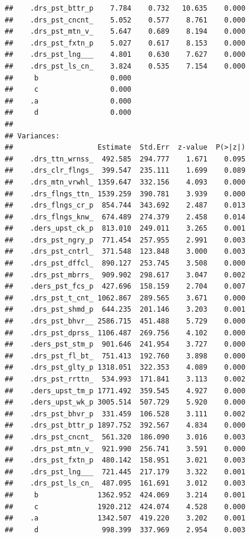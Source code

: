 \documentclass[
]{book}
\begin{document}
\begin{verbatim}
##    .drs_pst_bttr_p    7.784    0.732   10.635    0.000
##    .drs_pst_cncnt_    5.052    0.577    8.761    0.000
##    .drs_pst_mtn_v_    5.647    0.689    8.194    0.000
##    .drs_pst_fxtn_p    5.027    0.617    8.153    0.000
##    .drs_pst_lng___    4.801    0.630    7.627    0.000
##    .drs_pst_ls_cn_    3.824    0.535    7.154    0.000
##     b                 0.000                           
##     c                 0.000                           
##    .a                 0.000                           
##     d                 0.000                           
## 
## Variances:
##                    Estimate  Std.Err  z-value  P(>|z|)
##    .drs_ttn_wrnss_  492.585  294.777    1.671    0.095
##    .drs_clr_flngs_  399.547  235.111    1.699    0.089
##    .drs_mtn_vrwhl_ 1359.647  332.156    4.093    0.000
##    .drs_flngs_ttn_ 1539.259  390.781    3.939    0.000
##    .drs_flngs_cr_p  854.744  343.692    2.487    0.013
##    .drs_flngs_knw_  674.489  274.379    2.458    0.014
##    .ders_upst_ck_p  813.010  249.011    3.265    0.001
##    .drs_pst_ngry_p  771.454  257.955    2.991    0.003
##    .drs_pst_cntrl_  371.548  123.848    3.000    0.003
##    .drs_pst_dffcl_  890.127  253.745    3.508    0.000
##    .drs_pst_mbrrs_  909.902  298.617    3.047    0.002
##    .ders_pst_fcs_p  427.696  158.159    2.704    0.007
##    .drs_pst_t_cnt_ 1062.867  289.565    3.671    0.000
##    .drs_pst_shmd_p  644.235  201.146    3.203    0.001
##    .drs_pst_bhvr__ 2586.715  451.488    5.729    0.000
##    .drs_pst_dprss_ 1106.487  269.756    4.102    0.000
##    .ders_pst_stm_p  901.646  241.954    3.727    0.000
##    .drs_pst_fl_bt_  751.413  192.760    3.898    0.000
##    .drs_pst_glty_p 1318.051  322.353    4.089    0.000
##    .drs_pst_rrttn_  534.993  171.841    3.113    0.002
##    .ders_upst_tm_p 1771.492  359.545    4.927    0.000
##    .ders_upst_wk_p 3005.514  507.729    5.920    0.000
##    .drs_pst_bhvr_p  331.459  106.528    3.111    0.002
##    .drs_pst_bttr_p 1897.752  392.567    4.834    0.000
##    .drs_pst_cncnt_  561.320  186.090    3.016    0.003
##    .drs_pst_mtn_v_  921.990  256.741    3.591    0.000
##    .drs_pst_fxtn_p  480.142  158.951    3.021    0.003
##    .drs_pst_lng___  721.445  217.179    3.322    0.001
##    .drs_pst_ls_cn_  487.095  161.691    3.012    0.003
##     b              1362.952  424.069    3.214    0.001
##     c              1920.212  424.074    4.528    0.000
##    .a              1342.507  419.220    3.202    0.001
##     d               998.399  337.969    2.954    0.003
\end{verbatim}
\end{document}
